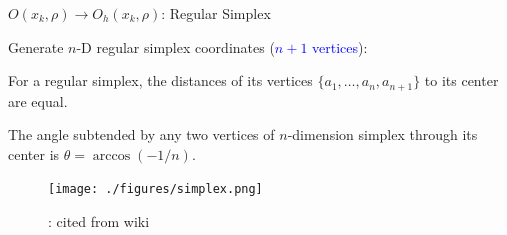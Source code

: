 \documentclass{beamer}
\begin{document}
\begin{frame}{$O(x_k, \rho)\rightarrow O_h(x_k, \rho)$: Regular Simplex}

\begin{itemize}
	\footnotesize{
	\item Generate $n$-D regular simplex coordinates
		(\textcolor{blue}{$n+1$ vertices}):
		}
	\begin{enumerate}
		\scriptsize{
		\item For a regular simplex, the distances of its vertices
			$\{a_1,\dots,a_n,a_{n+1}\}$ to its center are equal.
		\item The angle subtended by any two vertices of
			$n$-dimension simplex through its center is
			$\theta=\arccos(-1/n)$.  }
	\end{enumerate}
\end{itemize}
	\begin{figure}[!htbp]
		\centering
		  \texttt{[image: ./figures/simplex.png]}
		  \caption{: \scriptsize{cited from wiki}}
	\end{figure}
\end{frame}
\end{document}
